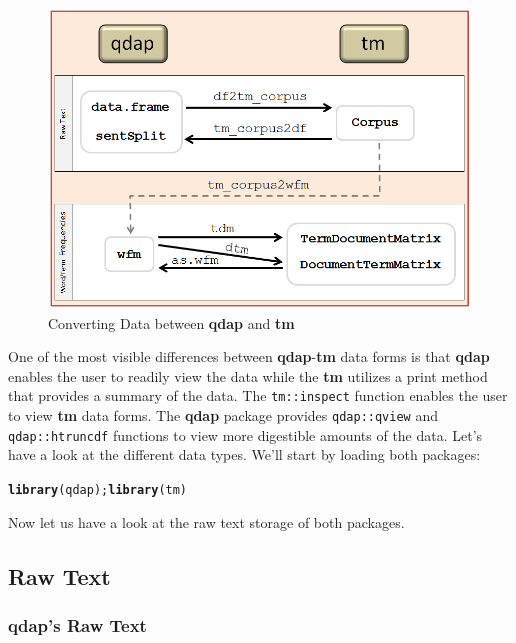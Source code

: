 \documentclass{article}\usepackage[]{graphicx}\usepackage[]{color}
\makeatletter
\newcommand{\hlstd}[1]{\textcolor[rgb]{0.345,0.345,0.345}{#1}}%
\newcommand{\hlkwd}[1]{\textcolor[rgb]{0.737,0.353,0.396}{\textbf{#1}}}%
\newenvironment{kframe}{%
 \def\at@end@of@kframe{}%
 \ifinner\ifhmode%
  \def\at@end@of@kframe{\end{minipage}}%
  \begin{minipage}{\columnwidth}%
 \fi\fi%
 \def\FrameCommand##1{\hskip\@totalleftmargin \hskip-\fboxsep
 \colorbox{shadecolor}{##1}\hskip-\fboxsep
     \hskip-\linewidth \hskip-\@totalleftmargin \hskip\columnwidth}%
 \MakeFramed {\advance\hsize-\width
   \@totalleftmargin\z@ \linewidth\hsize
   \@setminipage}}%
 {\par\unskip\endMakeFramed%
 \at@end@of@kframe}
\newenvironment{knitrout}{}{} %
\makeatother
\begin{document}
\begin{figure}[h!]
  \centering
    \includegraphics[width=4.60in]{imgs/data_convert.png}
    \caption{Converting Data between \textbf{qdap} and \textbf{tm}}
  \label{convert}
\end{figure}

One of the most visible differences between \textbf{qdap}-\textbf{tm} data forms is that \textbf{qdap} enables the user to readily view the data while the \textbf{tm} utilizes a print method that provides a summary of the data.  The \texttt{tm::inspect} function enables the user to view \textbf{tm} data forms. The \textbf{qdap} package provides \texttt{qdap::qview} and \texttt{qdap::htruncdf} functions to view more digestible amounts of the data. Let's have a look at the different data types.  We'll start by loading both packages:

\begin{knitrout}
\color{fgcolor}\begin{kframe}
\begin{alltt}
\hlkwd{library}\hlstd{(qdap);} \hlkwd{library}\hlstd{(tm)}
\end{alltt}
\end{kframe}
\end{knitrout}


\noindent Now let us have a look at the raw text storage of both packages. \\ 

\subsection{Raw Text}
\subsubsection{qdap's Raw Text}
\end{document}
